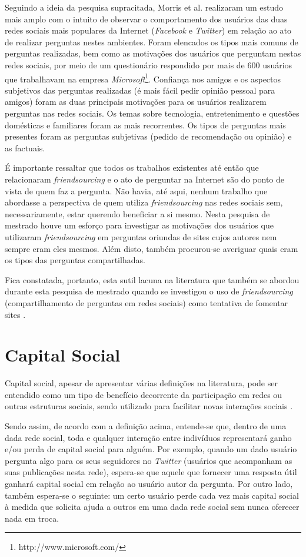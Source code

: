 Seguindo a ideia da pesquisa supracitada, Morris et al. \cite{morris2010people} realizaram um estudo mais amplo com o intuito de observar o comportamento dos usuários das duas redes sociais mais populares da Internet (\textit{Facebook} e \textit{Twitter}) em relação ao ato de realizar perguntas nestes ambientes. Foram elencados os tipos mais comuns de perguntas realizadas, bem como as motivações dos usuários que perguntam nestas redes sociais, por meio de um questionário respondido por mais de 600 usuários que trabalhavam na empresa \textit{Microsoft}\footnote{http://www.microsoft.com/}. Confiança nos amigos e os aspectos subjetivos das perguntas realizadas (é mais fácil pedir opinião pessoal para amigos) foram as duas principais motivações para os usuários realizarem perguntas nas redes sociais. Os temas sobre tecnologia, entretenimento e questões domésticas e familiares foram as mais recorrentes. Os tipos de perguntas mais presentes foram as perguntas subjetivas (pedido de recomendação ou opinião) e as factuais.

É importante ressaltar que todos os trabalhos existentes até então que relacionaram \textit{friendsourcing} e o ato de perguntar na Internet são do ponto de vista de quem faz a pergunta. Não havia, até aqui, nenhum trabalho que abordasse a perspectiva de quem utiliza \textit{friendsourcing} nas redes sociais sem, necessariamente, estar querendo beneficiar a si mesmo. Nesta pesquisa de mestrado houve um esforço para investigar as motivações dos usuários que utilizaram \textit{friendsourcing} em perguntas oriundas de sites \qa cujos autores nem sempre eram eles mesmos. Além disto, também procurou-se averiguar quais eram os tipos das perguntas compartilhadas.

Fica constatada, portanto, esta sutil lacuna na literatura que também se abordou durante esta pesquisa de mestrado quando se investigou o uso de \textit{friendsourcing} (compartilhamento de perguntas em redes sociais) como tentativa de fomentar sites \qanospace.

\section{Capital Social}
Capital social, apesar de apresentar várias definições na literatura, pode ser entendido como um tipo de benefício decorrente da participação em redes ou outras estruturas sociais, sendo utilizado para facilitar novas interações sociais \cite{portes2000social}.

Sendo assim, de acordo com a definição acima, entende-se que, dentro de uma dada rede social, toda e qualquer interação entre indivíduos representará ganho e/ou perda de capital social para alguém. Por exemplo, quando um dado usuário pergunta algo para os seus seguidores no \textit{Twitter} (usuários que acompanham as suas publicações nesta rede), espera-se que aquele que fornecer uma resposta útil ganhará capital social em relação ao usuário autor da pergunta. Por outro lado, também espera-se o seguinte: um certo usuário perde cada vez mais capital social à medida que solicita ajuda a outros em uma dada rede social sem nunca oferecer nada em troca. 

